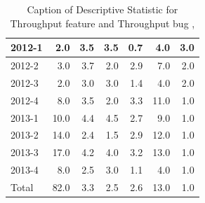 \documentclass[UKenglish]{ifimaster}  %
\begin{document}
\begin{table}[!htbp]
\begin{adjustwidth}{-2.5cm}{}
{{\begin{tabular}{ | l | r | r | r | r | r | r | }
2012-1 & 2.0 & 3.5 & 3.5 & 0.7 & 4.0 & 3.0\\ \hline
2012-2 & 3.0 & 3.7 & 2.0 & 2.9 & 7.0 & 2.0\\ \hline
2012-3 & 2.0 & 3.0 & 3.0 & 1.4 & 4.0 & 2.0\\ \hline
2012-4 & 8.0 & 3.5 & 2.0 & 3.3 & 11.0 & 1.0\\ \hline
2013-1 & 10.0 & 4.4 & 4.5 & 2.7 & 9.0 & 1.0\\ \hline
2013-2 & 14.0 & 2.4 & 1.5 & 2.9 & 12.0 & 1.0\\ \hline
2013-3 & 17.0 & 4.2 & 4.0 & 3.2 & 13.0 & 1.0\\ \hline
2013-4 & 8.0 & 2.5 & 3.0 & 1.1 & 4.0 & 1.0\\ \hline
Total & 82.0 & 3.3 & 2.5 & 2.6 & 13.0 & 1.0\\ \hline
\end{tabular}
}
}
\end{adjustwidth}
\caption[Optional caption for list of figures]{Caption of Descriptive Statistic for Throughput feature and Throughput bug  , }
\label{DS:6:2}
\end{table}
\end{document}
